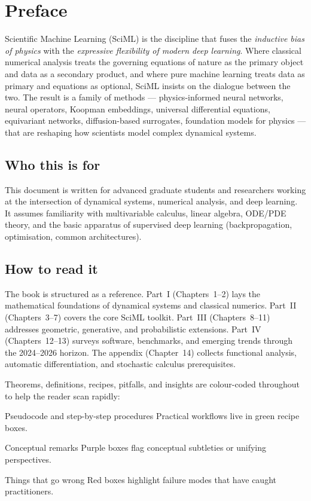 \chapter*{Preface}

Scientific Machine Learning (SciML) is the discipline that fuses the
\emph{inductive bias of physics} with the \emph{expressive flexibility
of modern deep learning}. Where classical numerical analysis treats the
governing equations of nature as the primary object and data as a
secondary product, and where pure machine learning treats data as
primary and equations as optional, SciML insists on the dialogue
between the two. The result is a family of methods --- physics-informed
neural networks, neural operators, Koopman embeddings, universal
differential equations, equivariant networks, diffusion-based
surrogates, foundation models for physics --- that are reshaping how
scientists model complex dynamical systems.

\section*{Who this is for}
This document is written for advanced graduate students and researchers
working at the intersection of dynamical systems, numerical analysis,
and deep learning. It assumes familiarity with multivariable calculus,
linear algebra, ODE/PDE theory, and the basic apparatus of supervised
deep learning (backpropagation, optimisation, common architectures).

\section*{How to read it}
The book is structured as a reference. Part~I (Chapters~1--2) lays the
mathematical foundations of dynamical systems and classical
numerics. Part~II (Chapters~3--7) covers the core SciML toolkit. Part~III
(Chapters~8--11) addresses geometric, generative, and probabilistic
extensions. Part~IV (Chapters~12--13) surveys software, benchmarks,
and emerging trends through the 2024--2026 horizon. The appendix
(Chapter~14) collects functional analysis, automatic differentiation,
and stochastic calculus prerequisites.

Theorems, definitions, recipes, pitfalls, and insights are colour-coded
throughout to help the reader scan rapidly:

\begin{recipe}{Pseudocode and step-by-step procedures}
Practical workflows live in green recipe boxes.
\end{recipe}
\begin{insight}{Conceptual remarks}
Purple boxes flag conceptual subtleties or unifying perspectives.
\end{insight}
\begin{pitfall}{Things that go wrong}
Red boxes highlight failure modes that have caught practitioners.
\end{pitfall}

